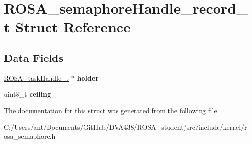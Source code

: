\hypertarget{struct_r_o_s_a__semaphore_handle__record__t}{}\section{R\+O\+S\+A\+\_\+semaphore\+Handle\+\_\+record\+\_\+t Struct Reference}
\label{struct_r_o_s_a__semaphore_handle__record__t}
\subsection*{Data Fields}
\begin{DoxyCompactItemize}
\item 
\mbox{\label{struct_r_o_s_a__semaphore_handle__record__t_aee44fde3d840181bcc9a8f4f85e32302}} 
\mbox{\hyperlink{structtcb__record__t}{R\+O\+S\+A\+\_\+task\+Handle\+\_\+t}} $\ast$ {\bfseries holder}
\item 
\mbox{\label{struct_r_o_s_a__semaphore_handle__record__t_aeae41d9c3a19d945957a534257e30792}} 
uint8\+\_\+t {\bfseries ceiling}
\end{DoxyCompactItemize}


The documentation for this struct was generated from the following file\+:\begin{DoxyCompactItemize}
\item 
C\+:/\+Users/ant/\+Documents/\+Git\+Hub/\+D\+V\+A438/\+R\+O\+S\+A\+\_\+student/src/include/kernel/rosa\+\_\+semaphore.\+h\end{DoxyCompactItemize}
